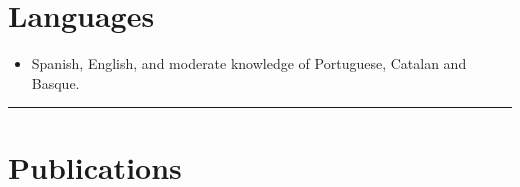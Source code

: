 \documentclass{article}
\begin{document}

\section*{Languages}
\begin{itemize}\itemsep 0pt
\item Spanish, English, and moderate knowledge of Portuguese, 
Catalan and Basque.
\end{itemize}


\bigskip

\hrule

\newpage


\section*{Publications}
\end{document}
